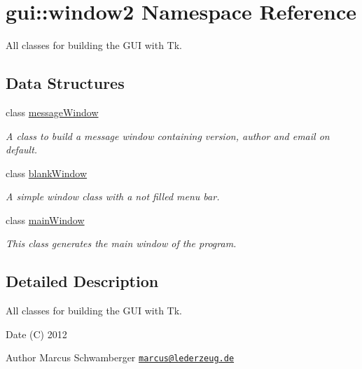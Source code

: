 \hypertarget{namespacegui_1_1window2}{
\section{gui::window2 Namespace Reference}
\label{namespacegui_1_1window2}
}


All classes for building the GUI with Tk.  


\subsection*{Data Structures}
\begin{DoxyCompactItemize}
\item 
class \hyperlink{classgui_1_1window2_1_1messageWindow}{messageWindow}
\begin{DoxyCompactList}\small\item\em A class to build a message window containing version, author and email on default. \end{DoxyCompactList}\item 
class \hyperlink{classgui_1_1window2_1_1blankWindow}{blankWindow}
\begin{DoxyCompactList}\small\item\em A simple window class with a not filled menu bar. \end{DoxyCompactList}\item 
class \hyperlink{classgui_1_1window2_1_1mainWindow}{mainWindow}
\begin{DoxyCompactList}\small\item\em This class generates the main window of the program. \end{DoxyCompactList}\end{DoxyCompactItemize}


\subsection{Detailed Description}
All classes for building the GUI with Tk. \begin{DoxyDate}{Date}
(C) 2012 
\end{DoxyDate}
\begin{DoxyAuthor}{Author}
Marcus Schwamberger  \href{mailto:marcus@lederzeug.de}{\tt marcus@lederzeug.de} 
\end{DoxyAuthor}
